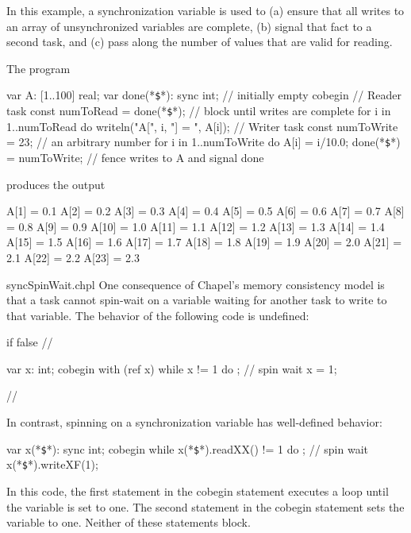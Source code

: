 \begin{example}
  In this example, a synchronization variable is used to (a) ensure that
  all writes to an array of unsynchronized variables are complete, (b)
  signal that fact to a second task, and (c) pass along the number of
  values that are valid for reading.

  The program
\begin{chapel}
var A: [1..100] real;
var done(*\texttt{\$}*): sync int;           // initially empty
cobegin {
  { // Reader task
    const numToRead = done(*\texttt{\$}*);   // block until writes are complete
    for i in 1..numToRead do
      writeln("A[", i, "] = ", A[i]);
  }
  {  // Writer task
    const numToWrite = 23;     // an arbitrary number
    for i in 1..numToWrite do
      A[i] = i/10.0;
    done(*\texttt{\$}*) = numToWrite;        // fence writes to A and signal done
  }
}
\end{chapel}
  produces the output
\begin{chapelprintoutput}{}
A[1] = 0.1
A[2] = 0.2
A[3] = 0.3
A[4] = 0.4
A[5] = 0.5
A[6] = 0.6
A[7] = 0.7
A[8] = 0.8
A[9] = 0.9
A[10] = 1.0
A[11] = 1.1
A[12] = 1.2
A[13] = 1.3
A[14] = 1.4
A[15] = 1.5
A[16] = 1.6
A[17] = 1.7
A[18] = 1.8
A[19] = 1.9
A[20] = 2.0
A[21] = 2.1
A[22] = 2.2
A[23] = 2.3
\end{chapelprintoutput}
\end{example}


\begin{chapelexample}{syncSpinWait.chpl}
One consequence of Chapel's memory consistency model is that a task cannot spin-wait on a
variable waiting for another task to write to that variable.  The behavior of
the following code is undefined:

\begin{chapelpre}
if false { // }
\end{chapelpre}
\begin{chapel}
var x: int;
cobegin with (ref x) {
  while x != 1 do ;  // spin wait
  x = 1;
}
\end{chapel}
\begin{chapelnoprint}
// {
}
\end{chapelnoprint}
In contrast, spinning on a synchronization variable has well-defined
behavior:
\begin{chapel}
var x(*\texttt{\$}*): sync int;
cobegin {
  while x(*\texttt{\$}*).readXX() != 1 do ;  // spin wait
  x(*\texttt{\$}*).writeXF(1);
}
\end{chapel}
\begin{chapeloutput}
\end{chapeloutput}

In this code, the first statement in the cobegin statement executes a
loop until the variable is set to one.  The second statement in the
cobegin statement sets the variable to one.  Neither of these
statements block.
\end{chapelexample}

